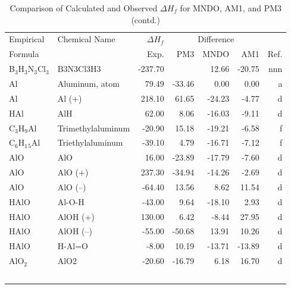 \begin{table}
\caption{Comparison of Calculated and Observed $\Delta H_f$ 
for MNDO, AM1, and PM3 (contd.)}
\begin{center}
\compresstable
\begin{tabular}{llrrrrr}
Empirical & Chemical Name & $\Delta H_f$ & \multicolumn{3}{c}{Difference} & \\
Formula   &               & Exp. & PM3 &  MNDO  &  AM1 &     Ref.\\
\hline
 B$_3$H$_3$N$_3$Cl$_3$   & B3N3Cl3H3                             &  -237.70    &  &    12.66  &   -20.75  &    nnn\\
 Al          & Aluminum, atom                         &    79.49    &   -33.46  &     0.00  &     0.00  &      a\\
 Al          & Al (+)                                 &   218.10    &    61.65  &   -24.23  &    -4.77  &      d\\
 HAl         & AlH                                    &    62.00    &     8.06  &   -16.03  &    -9.11  &      d\\
 C$_3$H$_9$Al      & Trimethylaluminum                      &   -20.90    &    15.18  &   -19.21  &    -6.58  &      f\\
 C$_6$H$_1$$_5$Al     & Triethylaluminum                       &   -39.10    &     4.79  &   -16.71  &    -7.12  &      f\\
 AlO         & AlO                                    &    16.00    &   -23.89  &   -17.79  &    -7.60  &      d\\
 AlO         & AlO   (+)                              &   237.30    &   -34.94  &   -14.26  &    -2.69  &      d\\
 AlO         & AlO   (--)                              &   -64.40    &    13.56  &     8.62  &    11.54  &      d\\
 HAlO        & Al-O-H                                 &   -43.00    &     9.64  &   -18.10  &     2.93  &      d\\
 HAlO        & AlOH  (+)                              &   130.00    &     6.42  &    -8.44  &    27.95  &      d\\
 HAlO        & AlOH  (--)                              &   -55.00    &   -50.68  &    13.91  &    10.26  &      d\\
 HAlO        & H-Al=O                                 &    -8.00    &    10.19  &   -13.71  &   -13.89  &      d\\
 AlO$_2$        & AlO2                                   &   -20.60    &   -16.79  &     6.18  &    16.70  &      d\\
$$
\end{tabular}
\end{center}
\end{table}
